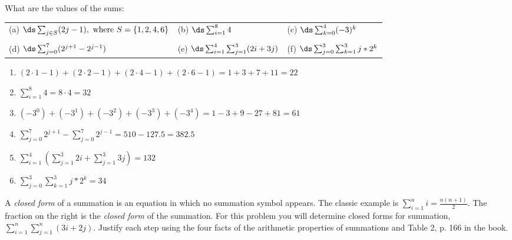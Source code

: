 \begin{questions}
 What are the values of the sums:\\
\begin{tabular}{lll}
    (a) $\ds \sum_{j\in S} (2j - 1), \text{ where } S = \{1, 2, 4, 6\}$
    & (b) $\ds \sum_{i=1}^{8} 4$  \hspace*{1in} 
    & (c) $\ds \sum_{k=0}^{4} (-3)^k$ \\
    & & \\
    (d) $\ds \sum_{j=0}^{7} (2^{j+1} - 2^{j-1})$
    & (e) $\ds \sum_{i=1}^{4} \sum_{j=1}^{3} (2i + 3j)$
    & (f) $\ds \sum_{j=0}^{3} \sum_{k=1}^{3} j*2^{k}$
\end{tabular}
    \ifprintanswers
        \vspace{-10pt}
   \fi
\begin{solution}
    \begin{enumerate}[label=(\alph*),itemsep=0pt,parsep=0pt,
    topsep=0pt,partopsep=0pt]
        \item $(2\cdot1 - 1)+(2\cdot2 - 1)+(2\cdot4 -1)+(2\cdot6-1) = 1+3+7+11 = 22$ 
        \item $\sum_{i=1}^8 4 = 8\cdot4 = 32$
        \item $(-3^0) + (-3^1) + (-3^2) + (-3^3) + (-3^4) = 1 -3 + 9 -27 + 81 = 61 $
        \item $\sum_{j=0}^7 2^{j+1} - \sum_{j=0}^7 2^{j-1} = 510 - 127.5 = 382.5$
        \item $\sum_{i=1}^4 \left( \sum_{j=1}^3 2i + \sum_{j=1}^3 3j \right) = 132$
        \item $\sum_{j=0}^3 \sum_{k=1}^3 j*2^k = 34$
    \end{enumerate}
\end{solution}


 \ifprintanswers 
\else 
A \textit{closed form} of a summation is an equation
in which no summation symbol appears.  The classic example is
$\displaystyle \sum_{i=1}^n i = \frac{n(n+1)}{2}$.  The fraction on
the right is the \textit{closed form} of the summation. 
\fi  For this
problem you will determine closed forms for summation, $\displaystyle \sum_{i=1}^n \sum_{j=1}^n (3i+ 2j)$.  Justify each step using the four facts of the arithmetic properties of summations and Table 2, p. 166 in the book.


\end{questions}

